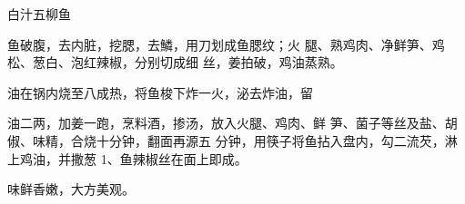 \begin{recipe}{白汁五柳鱼}

\ingredients


\cooking

\step 鱼破腹，去内脏，挖腮，去鱗，用刀划成鱼腮纹；火 腿、熟鸡肉、净鲜笋、鸡松、葱白、泡红辣椒，分别切成细 丝，姜拍破，鸡油蒸熟。

\step 油在锅内烧至八成热，将鱼梭下炸一火，泌去炸油，留

油二两，加姜一跑，烹料酒，掺汤，放入火腿、鸡肉、鲜 笋、菌子等丝及盐、胡俶、味精，合烧十分钟，翻面再源五 分钟，用筷子将鱼拈入盘内，勾二流芡，淋上鸡油，并撒葱 1、鱼辣椒丝在面上即成。

\notes

味鲜香嫩，大方美观。

\end{recipe}

